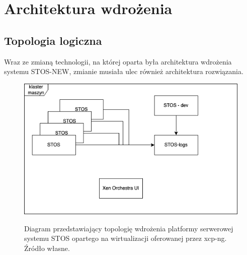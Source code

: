 \section{Architektura wdrożenia}
\subsection{Topologia logiczna}
Wraz ze zmianą technologii, na której oparta była architektura wdrożenia systemu STOS-NEW, zmianie musiała ulec również architektura rozwiązania.

\begin{figure}[!h]
	\begin{center}
		\resizebox{0.7\textwidth}{!} {
			\includegraphics{img/4/wdrozenie.png}
		}
		\caption[Topologia wdrożenia systemu STOS]{Diagram przedstawiający topologię wdrożenia platformy serwerowej systemu STOS opartego na wirtualizacji oferowanej przez xcp-ng. Źródło własne.}
		\label{diagramTopologiaStos}
	\end{center}
\end{figure}

